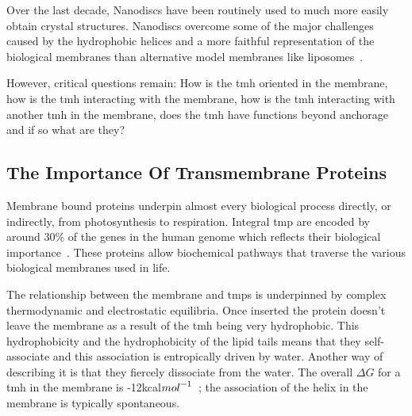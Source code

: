 
 Over the last decade, Nanodiscs have been routinely used to much more easily obtain crystal structures. Nanodiscs overcome some of the major challenges caused by the hydrophobic helices and a more faithful representation of the biological membranes than alternative model membranes like liposomes~\cite{Borch2009}.

 However, critical questions remain: How is the \gls{tmh} oriented in the membrane, how is the \gls{tmh} interacting with the membrane, how is the \gls{tmh} interacting with another \gls{tmh} in the membrane, does the \gls{tmh} have functions beyond anchorage and if so what are they?




\subsection{The Importance Of Transmembrane Proteins}
Membrane bound proteins underpin almost every biological process directly, or indirectly, from photosynthesis to respiration. Integral \gls{tmp} are encoded by around 30\% of the genes in the human genome which reflects their biological importance~\cite{Almen2009}. These proteins allow biochemical pathways that traverse the various biological membranes used in life. %

The relationship between the membrane and \gls{tmp}s is underpinned by complex thermodynamic and electrostatic equilibria. Once inserted the protein doesn't leave the membrane as a result of the \gls{tmh} being very hydrophobic. This hydrophobicity and the hydrophobicity of the lipid tails means that they self-associate and this association is entropically driven by water. Another way of describing it is that they fiercely dissociate from the water. The overall $\Delta G$ for a \gls{tmh} in the membrane is -12kcal${mol}^{\--1}$~\cite{Cymer2014}; the association of the helix in the membrane is typically spontaneous.

